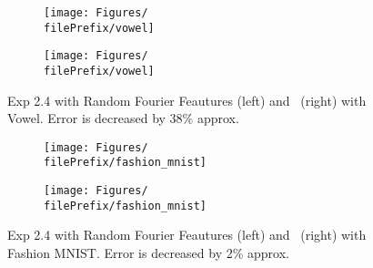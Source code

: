 \begin{figure}[H]
  \centering
  \renewcommand{\filePrefix}{\undPrefix/rff}
  \begin{subfigure}[t]{0.5\linewidth}
    \centering\captionsetup{width=.8\linewidth}\texttt{[image: Figures/\\filePrefix/vowel]}
    \label{fig:\undPrefix_vowel}
  \end{subfigure}%
  \renewcommand{\filePrefix}{\undPrefix/nys}%
  \begin{subfigure}[t]{0.5\linewidth}
    \centering\captionsetup{width=.8\linewidth}\texttt{[image: Figures/\\filePrefix/vowel]}
    \label{fig:\undPrefix_vowel}
  \end{subfigure}
  \caption*{Exp 2.4 with Random Fourier Feautures (left) and \Nys\ (right) with Vowel. Error is decreased by 38\% approx.}
\end{figure}


\begin{figure}[H]
  \centering
  \renewcommand{\filePrefix}{\undPrefix/rff}
  \begin{subfigure}[t]{0.5\linewidth}
    \centering\captionsetup{width=.8\linewidth}\texttt{[image: Figures/\\filePrefix/fashion\_mnist]}
    \label{fig:\undPrefix_vowel}
  \end{subfigure}%
  \renewcommand{\filePrefix}{\undPrefix/nys}%
  \begin{subfigure}[t]{0.5\linewidth}
    \centering\captionsetup{width=.8\linewidth}\texttt{[image: Figures/\\filePrefix/fashion\_mnist]}
    \label{fig:\undPrefix_vowel}
  \end{subfigure}
  \caption*{Exp 2.4 with Random Fourier Feautures (left) and \Nys\ (right)
   with Fashion MNIST. Error is decreased by 2\% approx.}
\end{figure}




